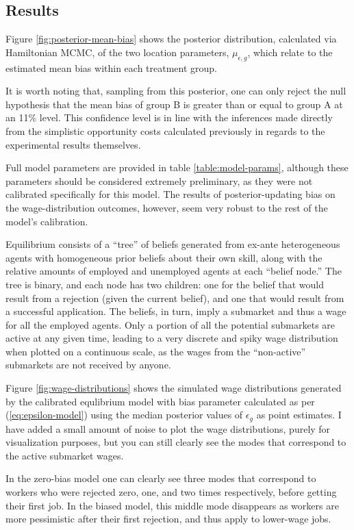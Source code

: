 \documentclass[a4paper,12pt]{article}
\begin{document}
\subsection{ Results }

Figure \ref{fig:posterior-mean-bias} shows the posterior distribution, calculated via Hamiltonian MCMC, of the two location parameters, $\mu_{\epsilon, g}$, which relate to the estimated mean bias within each treatment group.

It is worth noting that, sampling from this posterior, one can only reject the null hypothesis that the mean bias of group B is greater than or equal to group A at an 11\% level. This confidence level is in line with the inferences made directly from the simplistic opportunity costs calculated previously in regards to the experimental results themselves.

Full model parameters are provided in table \ref{table:model-params}, although these parameters should be considered extremely preliminary, as they were not calibrated specifically for this model. The results of posterior-updating bias on the wage-distribution outcomes, however, seem very robust to the rest of the model's calibration.

Equilibrium consists of a ``tree'' of beliefs generated from ex-ante heterogeneous agents with homogeneous prior beliefs about their own skill, along with the relative amounts of employed and unemployed agents at each ``belief node.'' The tree is binary, and each node has two children: one for the belief that would result from a rejection (given the current belief), and one that would result from a successful application. The beliefs, in turn, imply a submarket and thus a wage for all the employed agents. Only a portion of all the potential submarkets are active at any given time, leading to a very discrete and spiky wage distribution when plotted on a continuous scale, as the wages from the ``non-active'' submarkets are not received by anyone.

Figure \ref{fig:wage-distributions} shows the simulated wage distributions generated by the calibrated equlibrium model with bias parameter calculated as per (\ref{eq:epsilon-model}) using the median posterior values of $\epsilon_g$ as point estimates. I have added a small amount of noise to plot the wage distributions, purely for visualization purposes, but you can still clearly see the modes that correspond to the active submarket wages.

In the zero-bias model one can clearly see three modes that correspond to workers who were rejected zero, one, and two times respectively, before getting their first job. In the biased model, this middle mode disappears as workers are more pessimistic after their first rejection, and thus apply to lower-wage jobs.
\end{document}
